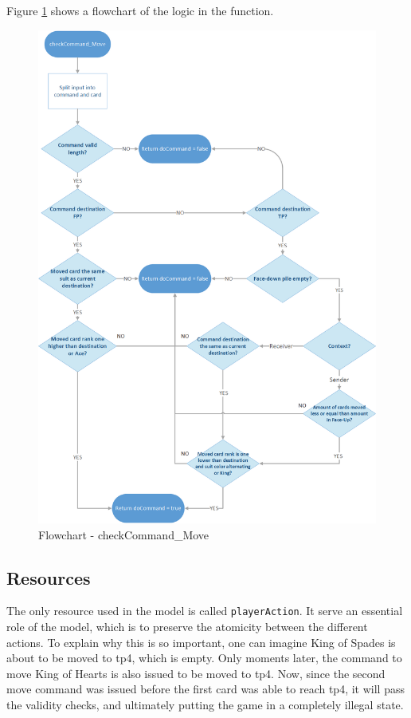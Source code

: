 \documentclass[runningheads,a4paper]{llncs}
\begin{document}
Figure \ref{fig:checkCommand_Move} shows a flowchart of the logic in the function.
\begin{figure}
	\begin{center}
		\includegraphics[width=\textwidth]{images/checkcommandmove}
		\caption{Flowchart - checkCommand\_Move}
		\label{fig:checkCommand_Move}
	\end{center}
\end{figure}
\clearpage
\subsection{Resources}
\label{sec:3_Resources}
The only resource used in the model is called \verb!playerAction!. It serve an essential role of the model, which is to preserve the atomicity between the different actions. To explain why this is so important, one can imagine King of Spades is about to be moved to \ac{tp}4, which is empty. Only moments later, the command to move King of Hearts is also issued to be moved to \ac{tp}4. Now, since the second move command was issued before the first card was able to reach \ac{tp}4, it will pass the validity checks, and ultimately putting the game in a completely illegal state.\\
\end{document}
